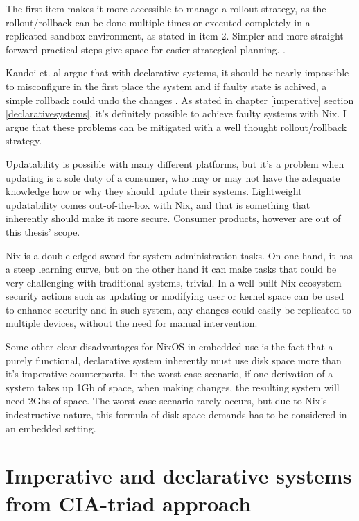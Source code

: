 The first item makes it more accessible to manage a rollout strategy,
as the rollout/rollback can be done multiple times or executed
completely in a replicated sandbox environment, as stated in item
2. Simpler and more straight forward practical steps give space for
easier strategical planning. \cite{kandoi2021operating}.

Kandoi et. al argue that with declarative systems, it should be nearly
impossible to misconfigure in the first place the system and if faulty
state is achived, a simple rollback could undo the changes
\cite{kandoi2021operating}. As stated in chapter \ref{imperative}
section \ref{declarativesystems}, it's definitely possible to achieve
faulty systems with Nix. I argue that these problems can be mitigated
with a well thought rollout/rollback strategy.

Updatability is possible with many different platforms, but it's a
problem when updating is a sole duty of a consumer, who may or may not
have the adequate knowledge how or why they should update their
systems. Lightweight updatability comes out-of-the-box with Nix, and
that is something that inherently should make it more secure. Consumer
products, however are out of this thesis' scope.

Nix is a double edged sword for system administration tasks. On one
hand, it has a steep learning curve, but on the other hand it can make
tasks that could be very challenging with traditional systems,
trivial. In a well built Nix ecosystem security actions such as
updating or modifying user or kernel space can be used to enhance
security and in such system, any changes could easily be replicated to
multiple devices, without the need for manual intervention.

Some other clear disadvantages for NixOS in embedded use is the fact
that a purely functional, declarative system inherently must use disk
space more than it's imperative counterparts. In the worst case
scenario, if one derivation of a system takes up 1Gb of space, when
making changes, the resulting system will need 2Gbs of space. The
worst case scenario rarely occurs, but due to Nix's indestructive
nature, this formula of disk space demands has to be considered in an
embedded setting. \cite{dolstra2007purely}

\section{Imperative and declarative systems from CIA-triad approach} \label{imperativeanddeclarative}

